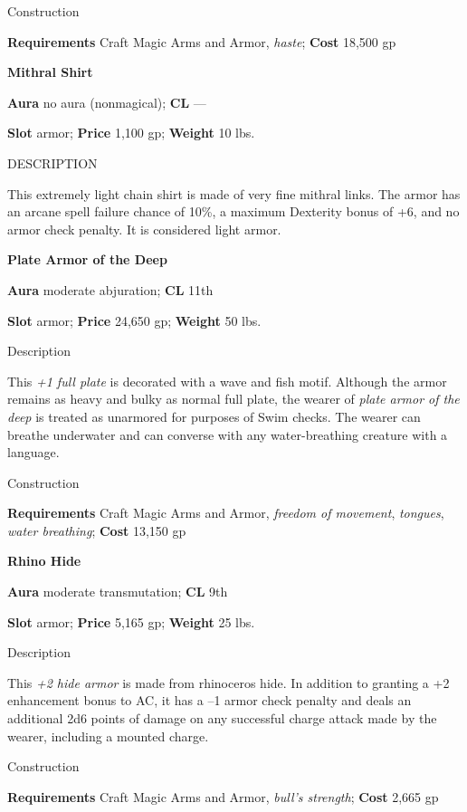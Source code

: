 Construction
				
\textbf{Requirements} Craft Magic Arms and Armor, \textit{haste}; \textbf{Cost }18,500 gp
				
\textbf{Mithral Shirt}
				
\textbf{Aura} no aura (nonmagical); \textbf{CL} ---
				
\textbf{Slot} armor; \textbf{Price} 1,100 gp; \textbf{Weight} 10 lbs.
				
DESCRIPTION
				
This extremely light chain shirt is made of very fine mithral links. The armor has an arcane spell failure chance of 10\%, a maximum Dexterity bonus of +6, and no armor check penalty. It is considered light armor. 
				
\textbf{Plate Armor of the Deep}
				
\textbf{Aura} moderate abjuration; \textbf{CL} 11th
				
\textbf{Slot} armor; \textbf{Price} 24,650 gp; \textbf{Weight }50 lbs.
				
Description
				
This \textit{+1 full plate} is decorated with a wave and fish motif. Although the armor remains as heavy and bulky as normal full plate, the wearer of \textit{plate armor of the deep} is treated as unarmored for purposes of Swim checks. The wearer can breathe underwater and can converse with any water-breathing creature with a language. 
				
Construction
				
\textbf{Requirements} Craft Magic Arms and Armor, \textit{freedom of movement}, \textit{tongues}, \textit{water breathing}; \textbf{Cost }13,150 gp
				
\textbf{Rhino Hide}
				
\textbf{Aura} moderate transmutation; \textbf{CL} 9th
				
\textbf{Slot} armor; \textbf{Price} 5,165 gp; \textbf{Weight }25 lbs.
				
Description
				
This \textit{+2 hide armor} is made from rhinoceros hide. In addition to granting a +2 enhancement bonus to AC, it has a --1 armor check penalty and deals an additional 2d6 points of damage on any successful charge attack made by the wearer, including a mounted charge. 
				
Construction
				
\textbf{Requirements} Craft Magic Arms and Armor, \textit{bull's strength}; \textbf{Cost }2,665 gp
				
